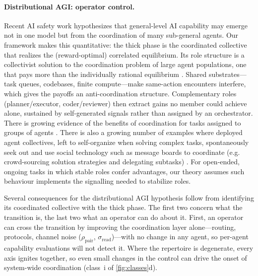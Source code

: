 \documentclass[
  aps,prx,
  reprint,
  superscriptaddress,
  nofootinbib,
  longbibliography
]{revtex4-2}
\newcommand{\rhopair}{\rho_{\mathrm{pair}}}
\newcommand{\sread}{\sigma_{\mathrm{read}}}
\begin{document}
\paragraph{Distributional AGI: operator control.} Recent AI safety work \cite{tomasev2026} hypothesizes that general-level AI capability may emerge not in one model but from the coordination of many sub-general agents. Our framework makes this quantitative: the thick phase is the coordinated collective that realizes the (reward-optimal) correlated equilibrium. Its role structure is a collectivist solution to the coordination problem of large agent populations, one that pays more than the individually rational equilibrium \cite{jordan2025collectivist}. Shared substrates---task queues, codebases, finite compute---make same-action encounters interfere, which gives the payoffs an anti-coordination structure. Complementary roles (planner/executor, coder/reviewer) then extract gains no member could achieve alone, sustained by self-generated signals rather than assigned by an orchestrator. There is growing evidence of the benefits of coordination for tasks assigned to groups of agents \cite{anthropic2026}. There is also a growing number of examples where deployed agent collectives, left to self-organize when solving complex tasks, spontaneously seek out and use social technology such as message boards to coordinate (e.g. crowd-sourcing solution strategies and delegating subtasks) \cite{openai2026incidentreport,vonarx2026collusion}. For open-ended, ongoing tasks in which stable roles confer advantages, our theory assumes such behaviour implements the signalling needed to stabilize roles.

Several consequences for the distributional AGI hypothesis follow from identifying its coordinated collective with the thick phase. The first two concern what the transition is, the last two what an operator can do about it. First, an operator can cross the transition by improving the coordination layer alone---routing, protocols, channel noise ($\rhopair$, $\sread$)---with no change in any agent, so per-agent capability evaluations will not detect it. Where the repertoire is degenerate, every axis ignites together, so even small changes in the control can drive the onset of system-wide coordination (class~i of \cref{fig:classes}d).
\end{document}
